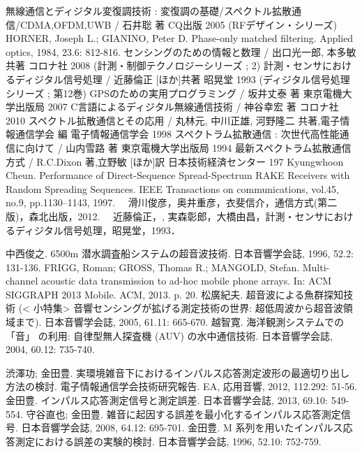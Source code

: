 \begin{thebibliography}{99}
 無線通信とディジタル変復調技術 : 変復調の基礎/スペクトル拡散通信/CDMA,OFDM,UWB / 石井聡 著 CQ出版 2005 (RFデザイン・シリーズ)
       HORNER, Joseph L.; GIANINO, Peter D. Phase-only matched filtering. Applied optics, 1984, 23.6: 812-816.
 センシングのための情報と数理 / 出口光一郎, 本多敏 共著 コロナ社 2008 (計測・制御テクノロジーシリーズ ; 2)
 計測・センサにおけるディジタル信号処理 / 近藤倫正 [ほか]共著 昭晃堂 1993 (ディジタル信号処理シリーズ ; 第12巻)
 GPSのための実用プログラミング / 坂井丈泰 著 東京電機大学出版局 2007
 C言語によるディジタル無線通信技術 / 神谷幸宏 著 コロナ社 2010
 スペクトル拡散通信とその応用 / 丸林元, 中川正雄, 河野隆二 共著,電子情報通信学会 編 電子情報通信学会 1998
 スペクトラム拡散通信 : 次世代高性能通信に向けて / 山内雪路 著 東京電機大学出版局 1994
 最新スペクトラム拡散通信方式 / R.C.Dixon 著,立野敏 [ほか]訳 日本技術経済センター 197
 Kyungwhoon Cheun. Performance of Direct-Sequence Spread-Spectrum RAKE Receivers with Random Spreading Sequences. IEEE Transactions on communications, vol.45, no.9, pp.1130--1143, 1997.
　滑川俊彦，奥井重彦，衣斐信介，通信方式(第二版)，森北出版，2012.
　近藤倫正，, 実森彰郎，大橋由昌，計測・センサにおけるディジタル信号処理，昭晃堂，1993．

 中西俊之. 6500m 潜水調査船システムの超音波技術. 日本音響学会誌, 1996, 52.2: 131-136.
 FRIGG, Roman; GROSS, Thomas R.; MANGOLD, Stefan. Multi-channel acoustic data transmission to ad-hoc mobile phone arrays. In: ACM SIGGRAPH 2013 Mobile. ACM, 2013. p. 20.
 松廣紀夫. 超音波による魚群探知技術 (< 小特集> 音響センシングが拡げる測定技術の世界: 超低周波から超音波領域まで). 日本音響学会誌, 2005, 61.11: 665-670.
 越智寛. 海洋観測システムでの 「音」 の利用: 自律型無人探査機 (AUV) の水中通信技術. 日本音響学会誌, 2004, 60.12: 735-740.

 渋澤功; 金田豊. 実環境雑音下におけるインパルス応答測定波形の最適切り出し方法の検討. 電子情報通信学会技術研究報告. EA, 応用音響, 2012, 112.292: 51-56.
 金田豊. インパルス応答測定信号と測定誤差. 日本音響学会誌, 2013, 69.10: 549-554.
 守谷直也; 金田豊. 雑音に起因する誤差を最小化するインパルス応答測定信号. 日本音響学会誌, 2008, 64.12: 695-701.
 金田豊. M 系列を用いたインパルス応答測定における誤差の実験的検討. 日本音響学会誌, 1996, 52.10: 752-759.


\end{thebibliography}
